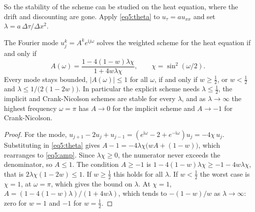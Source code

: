 \begin{chapterrefs}
So the stability of the scheme can be studied on the heat equation, where the drift and discounting
are gone. Apply \cref{eq5:theta} to $u_\tau=au_{xx}$ and set $\lambda=a\,\Delta\tau/\Delta x^2$.

\begin{theorem}\label{thm5:vonneumann}
The Fourier mode $u^k_j=A^ke^{\mathrm ij\omega}$ solves the weighted scheme for the heat equation if and
only if
\begin{equation}\label{eq5:amp}
  A(\omega)=\frac{1-4(1-w)\lambda\chi}{1+4w\lambda\chi},\qquad \chi=\sin^2(\omega/2).
\end{equation}
Every mode stays bounded, $|A(\omega)|\le1$ for all $\omega$, if and only if $w\ge\tfrac12$, or
$w<\tfrac12$ and $\lambda\le1/\bigl(2(1-2w)\bigr)$. In particular the explicit scheme needs
$\lambda\le\tfrac12$, the implicit and Crank-Nicolson schemes are stable for every $\lambda$, and as
$\lambda\to\infty$ the highest frequency $\omega=\pi$ has $A\to0$ for the implicit scheme and $A\to-1$ for
Crank-Nicolson.
\end{theorem}

\begin{proof}
For the mode, $u_{j+1}-2u_j+u_{j-1}=(e^{\mathrm i\omega}-2+e^{-\mathrm i\omega})u_j=-4\chi\,u_j$. Substituting
in \cref{eq5:theta} gives $A-1=-4\lambda\chi\bigl(wA+(1-w)\bigr)$, which rearranges to
\cref{eq5:amp}. Since $\lambda\chi\ge0$, the numerator never exceeds the denominator, so $A\le1$. The
condition $A\ge-1$ is $1-4(1-w)\lambda\chi\ge-1-4w\lambda\chi$, that is $2\lambda\chi(1-2w)\le1$.
If $w\ge\tfrac12$ this holds for all $\lambda$. If $w<\tfrac12$ the worst case is $\chi=1$, at
$\omega=\pi$, which gives the bound on $\lambda$. At $\chi=1$, $A=(1-4(1-w)\lambda)/(1+4w\lambda)$,
which tends to $-(1-w)/w$ as $\lambda\to\infty$: zero for $w=1$ and $-1$ for $w=\tfrac12$.
\end{proof}


\end{chapterrefs}
